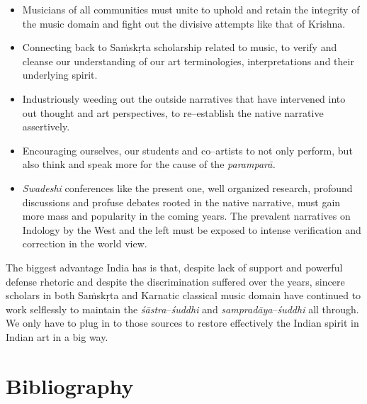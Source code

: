 \begin{itemize}
\itemsep=0pt
\item Musicians of all communities must unite to uphold and retain the integrity of the music domain and fight out the divisive attempts like that of Krishna.

 \item Connecting back to Saṁskṛta scholarship related to music, to verify and cleanse our understanding of our art terminologies, interpretations and their underlying spirit.

 \item Industriously weeding out the outside narratives that have intervened into out thought and art perspectives, to re–establish the native narrative assertively.

 \item Encouraging ourselves, our students and co–artists to not only perform, but also think and speak more for the cause of the \textit{paramparā.}

 \item \textit{Swadeshi} conferences like the present one, well organized research, profound discussions and profuse debates rooted in the native narrative, must gain more mass and popularity in the coming years. The prevalent narratives on Indology by the West and the left must be exposed to intense verification and correction in the world view.

\end{itemize}

The biggest advantage India has is that, despite lack of support and powerful defense rhetoric and despite the discrimination suffered over the years, sincere scholars in both Saṁskṛta and Karnatic classical music domain have continued to work selflessly to maintain the \textit{śāstra}–\textit{śuddhi} and \textit{sampradāya}–\textit{śuddhi} all through. We only have to plug in to those sources to restore effectively the Indian spirit in Indian art in a big way.

\newpage

\section*{Bibliography}

